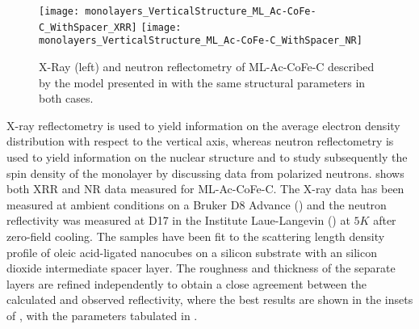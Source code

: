 \documentclass[\main/dresen_thesis.tex]{subfiles}
\begin{document}
  \label{sec:monolayers:structure:verticalModel}
  \begin{figure}[tb]
    \centering
    \texttt{[image: monolayers\_VerticalStructure\_ML\_Ac-CoFe-C\_WithSpacer\_XRR]}
    \texttt{[image: monolayers\_VerticalStructure\_ML\_Ac-CoFe-C\_WithSpacer\_NR]}
    \caption{\label{fig:monolayers:structure:XRR:ML-Ac-CoFe-C-WithSpacer}X-Ray (left) and neutron
    reflectometry of ML-Ac-CoFe-C described by the model presented in  with the same structural parameters in both cases.}
  \end{figure}

  X-ray reflectometry is used to yield information on the average electron density distribution with respect to the vertical axis, whereas neutron reflectometry is used to yield information on the nuclear structure and to study subsequently the spin density of the monolayer by discussing data from polarized neutrons.
   shows both XRR and NR data measured for ML-Ac-CoFe-C.
  The X-ray data has been measured at ambient conditions on a Bruker D8 Advance () and the neutron reflectivity was measured at D17 in the Institute Laue-Langevin () at $5 \unit{K}$ after zero-field cooling.
  The samples have been fit to the scattering length density profile of oleic acid-ligated nanocubes on a silicon
  substrate with an silicon dioxide intermediate spacer layer.
  The roughness and thickness of the separate layers are refined independently to obtain a close agreement between the calculated and observed reflectivity, where the best results are shown in the insets of , with the parameters tabulated in .
\end{document}

